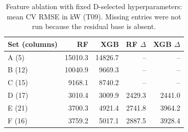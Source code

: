 \begin{table}[H]\centering\small
\caption{Feature ablation with fixed D-selected hyperparameters: mean CV RMSE in kW (T09). Missing entries were not run because the residual base is absent.}\label{tab:ablation}
\setlength{\tabcolsep}{4pt}
\begin{tabular}{lrrrr}
\toprule
Set (columns) & RF & XGB & RF $\Delta$ & XGB $\Delta$ \\
\midrule
A (5) & \num{15010.3} & \num{14826.7} & -- & -- \\
B (12) & \num{10040.9} & \num{9669.3} & -- & -- \\
C (15) & \num{9168.1} & \num{8740.2} & -- & -- \\
D (17) & \num{3010.4} & \num{3009.9} & \num{2429.3} & \num{2441.0} \\
E (21) & \num{3700.3} & \num{4921.4} & \num{2741.8} & \num{3964.2} \\
F (16) & \num{3759.2} & \num{5017.1} & \num{2887.5} & \num{3928.4} \\
\bottomrule\end{tabular}
\end{table}
